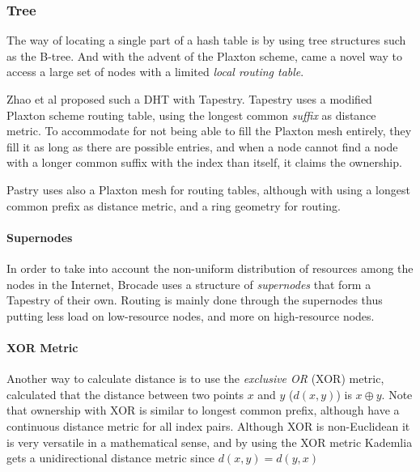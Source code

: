 \subsubsection{Tree}
\label{theory:Geometry:Tree}

The  way of locating a single part of a hash table is by using tree
 structures such as the B-tree. And with the advent of the Plaxton
 scheme\cite{plaxton-97-accessing-nearby}, came a novel way to access a large set of
 nodes with a limited \emph{local routing table}.

Zhao et al proposed such a DHT with Tapestry\cite{zhao-01-tapestry}. Tapestry uses
 a modified Plaxton scheme routing table, using the longest common \emph{suffix} as
 distance metric. To accommodate for not being able to fill the Plaxton mesh entirely, they
 fill it as long as there are possible entries, and when a node cannot find a node
 with a longer common suffix with the index than itself, it claims the ownership.

Pastry uses also a Plaxton mesh for routing tables\cite{rowston-01-storage-past},
 although with using a longest common prefix as distance metric, and a ring
 geometry for  routing.

\paragraph{Supernodes}
In order to take into account the non-uniform distribution of resources among the
 nodes in the Internet, Brocade uses a structure of \emph{supernodes} that form a
 Tapestry of their own\cite{zhao-02-brocade}. Routing is mainly done through the
 supernodes thus putting less load on low-resource nodes, and more on high-resource
 nodes.

\paragraph{XOR Metric}
\label{theory:Geometry:XOR}

Another way to calculate distance is to use the \emph{exclusive OR} (XOR) metric, calculated
 that the distance between two points $x$ and $y$ ($d(x,y)$) is $x\oplus y$. Note that
 ownership with XOR is similar to longest common prefix, although have a continuous distance
 metric for all index pairs. Although XOR is non-Euclidean it is very versatile
 in a mathematical sense\cite{maymounkov-02-kademlia}, and by using the XOR metric Kademlia
 gets a unidirectional distance metric since $d(x,y) = d(y,x)$

